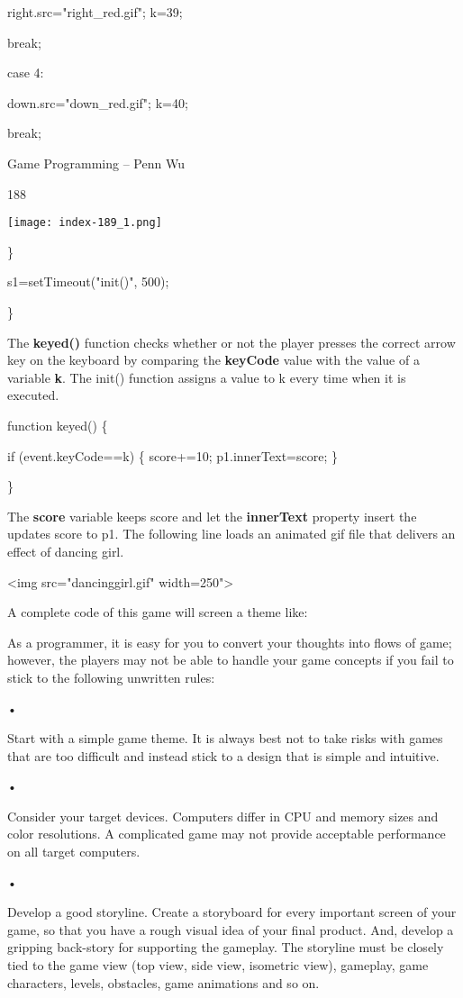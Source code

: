 \documentclass[
]{article}
\begin{document}
right.src="right\_red.gif"; k=39;

break;

case 4:

down.src="down\_red.gif"; k=40;

break;

Game Programming -- Penn Wu

188

\protect\hypertarget{index_split_011.htmlux5cux23p189}{}{}\texttt{[image: index-189\_1.png]}

\}

s1=setTimeout("init()", 500);

\}

The \textbf{keyed()} function checks whether or not the player presses
the correct arrow key on the keyboard by comparing the \textbf{keyCode}
value with the value of a variable \textbf{k}. The init() function
assigns a value to k every time when it is executed.

function keyed() \{

if (event.keyCode==k) \{ score+=10; p1.innerText=score; \}

\}

The \textbf{score} variable keeps score and let the \textbf{innerText}
property insert the updates score to p1. The following line loads an
animated gif file that delivers an effect of dancing girl.

\textless img src="dancinggirl.gif" width=250"\textgreater{}

A complete code of this game will screen a theme like:

As a programmer, it is easy for you to convert your thoughts into flows
of game; however, the players may not be able to handle your game
concepts if you fail to stick to the following unwritten rules:

•

Start with a simple game theme. It is always best not to take risks with
games that are too difficult and instead stick to a design that is
simple and intuitive.

•

Consider your target devices. Computers differ in CPU and memory sizes
and color resolutions. A complicated game may not provide acceptable
performance on all target computers.

•

Develop a good storyline. Create a storyboard for every important screen
of your game, so that you have a rough visual idea of your final
product. And, develop a gripping back-story for supporting the gameplay.
The storyline must be closely tied to the game view (top view, side
view, isometric view), gameplay, game characters, levels, obstacles,
game animations and so on.
\end{document}

